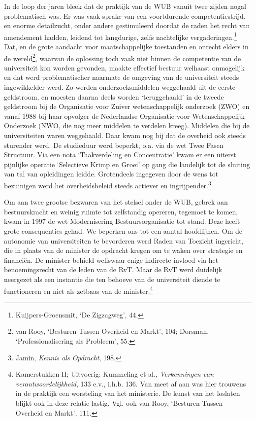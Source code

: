 \documentclass[smallauthor, chapterhaspagenum, nochapterinheader, pagenuminheader,  bigchapnum,medium2, tocpages, garamond, titleinheader]{jote-book}
\begin{document}
	In de loop der jaren bleek dat de praktijk van de WUB vanuit twee zijden nogal problematisch was. Er was vaak sprake van een voortdurende competentiestrijd, en enorme detailzucht, onder andere gestimuleerd doordat de raden het recht van amendement hadden, leidend tot langdurige, zelfs nachtelijke vergaderingen.\footnote{Kuijpers-Groensmit, ‘De Zigzagweg', 44.} Dat, en de grote aandacht voor maatschappelijke toestanden en onrecht elders in de wereld\footnote{van Rooy, ‘Besturen Tussen Overheid en Markt', 104; Dorsman, ‘Professionalisering als Probleem', 55.}, waarvan de oplossing toch vaak niet binnen de competentie van de universiteit kon worden gevonden, maakte effectief bestuur welhaast onmogelijk en dat werd problematischer naarmate de omgeving van de universiteit steeds ingewikkelder werd. Zo werden onderzoeksmiddelen weggehaald uit de eerste geldstroom, en moesten daarna deels worden ‘teruggehaald' in de tweede geldstroom bij de Organisatie voor Zuiver wetenschappelijk onderzoek (ZWO) en vanaf 1988 bij haar opvolger de Nederlandse Organisatie voor Wetenschappelijk Onderzoek (NWO, die nog meer middelen te verdelen kreeg). Middelen die bij de universiteiten waren weggehaald. Daar kwam nog bij dat de overheid ook steeds sturender werd. De studieduur werd beperkt, o.a. via de wet Twee Fasen Structuur. Via een nota ‘Taakverdeling en Concentratie' kwam er een uiterst pijnlijke operatie ‘Selectieve Krimp en Groei' op gang die landelijk tot de sluiting van tal van opleidingen leidde. Grotendeels ingegeven door de wens tot bezuinigen werd het overheidsbeleid steeds actiever en ingrijpender.\footnote{Jamin, \emph{Kennis als Opdracht}, 198.}



	Om aan twee grootse bezwaren van het stelsel onder de WUB, gebrek aan bestuurskracht en weinig ruimte tot zelfstandig opereren, tegemoet te komen, kwam in 1997 de wet Modernisering Bestuursorganisatie tot stand. Deze heeft grote consequenties gehad. We beperken ons tot een aantal hoofdlijnen. Om de autonomie van universiteiten te bevorderen werd Raden van Toezicht ingericht, die in plaats van de minister de opdracht kregen om te waken over strategie en financiën. De minister behield weliswaar enige indirecte invloed via het benoemingsrecht van de leden van de RvT. Maar de RvT werd duidelijk neergezet als een instantie die ten behoeve van de universiteit diende te functioneren en niet als zetbaas van de minister.\footnote{Kamerstukken II; Uitvoerig: Kummeling et al., \emph{Verkenningen van verantwoordelijkheid}, 133 e.v., i.h.b. 136. Van meet af aan was hier trouwens in de praktijk een worsteling van het ministerie. De kunst van het loslaten blijkt ook in deze relatie lastig. Vgl. ook van Rooy, ‘Besturen Tussen Overheid en Markt', 111. }
\end{document}
